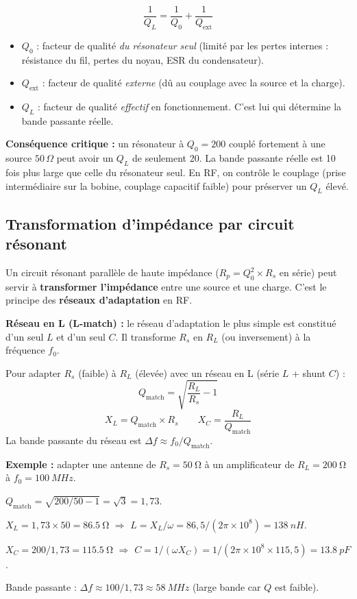 \documentclass[12pt,a4paper,twoside]{book}
\begin{document}
\begin{formule}
\[
\boxed{\frac{1}{Q_L} = \frac{1}{Q_0} + \frac{1}{Q_{\text{ext}}}}
\]
\begin{itemize}[nosep]
\item $Q_0$ : facteur de qualité \textit{du résonateur seul} (limité par les pertes internes : résistance du fil, pertes du noyau, ESR du condensateur).
\item $Q_{\text{ext}}$ : facteur de qualité \textit{externe} (dû au couplage avec la source et la charge).
\item $Q_L$ : facteur de qualité \textit{effectif} en fonctionnement. C'est lui qui détermine la bande passante réelle.
\end{itemize}
\end{formule}

\begin{attention}
\textbf{Conséquence critique :} un résonateur à $Q_0 = 200$ couplé fortement à une source $50\,\Omega$ peut avoir un $Q_L$ de seulement 20. La bande passante réelle est 10 fois plus large que celle du résonateur seul. En RF, on contrôle le couplage (prise intermédiaire sur la bobine, couplage capacitif faible) pour préserver un $Q_L$ élevé.
\end{attention}

\subsection{Transformation d'impédance par circuit résonant}

Un circuit résonant parallèle de haute impédance ($R_p = Q_0^2 \times R_s$ en série) peut servir à \textbf{transformer l'impédance} entre une source et une charge. C'est le principe des \textbf{réseaux d'adaptation} en RF.

\textbf{Réseau en L (L-match) :} le réseau d'adaptation le plus simple est constitué d'un seul $L$ et d'un seul $C$. Il transforme $R_s$ en $R_L$ (ou inversement) à la fréquence $f_0$.

\begin{formule}
Pour adapter $R_s$ (faible) à $R_L$ (élevée) avec un réseau en L (série $L$ + shunt $C$) :
\[
Q_{\text{match}} = \sqrt{\frac{R_L}{R_s} - 1}
\]
\[
X_L = Q_{\text{match}} \times R_s \qquad X_C = \frac{R_L}{Q_{\text{match}}}
\]
La bande passante du réseau est $\Delta f \approx f_0/Q_{\text{match}}$.
\end{formule}

\begin{pratique}
\textbf{Exemple :} adapter une antenne de $R_s = \SI{50}{\ohm}$ à un amplificateur de $R_L = \SI{200}{\ohm}$ à $f_0 = \SI{100}{MHz}$.

$Q_{\text{match}} = \sqrt{200/50 - 1} = \sqrt{3} = 1{,}73$.

$X_L = 1{,}73 \times 50 = \SI{86.5}{\ohm}$ $\Rightarrow$ $L = X_L/\omega = 86{,}5/(2\pi\times10^8) = \SI{138}{nH}$.

$X_C = 200/1{,}73 = \SI{115.5}{\ohm}$ $\Rightarrow$ $C = 1/(\omega X_C) = 1/(2\pi\times10^8\times115{,}5) = \SI{13.8}{pF}$.

Bande passante : $\Delta f \approx 100/1{,}73 \approx \SI{58}{MHz}$ (large bande car $Q$ est faible).
\end{pratique}
\end{document}
